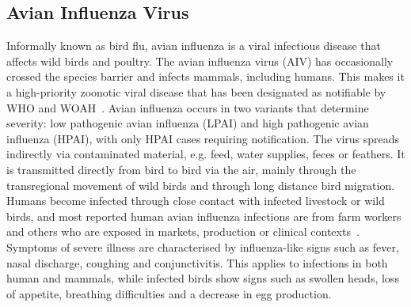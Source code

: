 \subsection{Avian Influenza Virus}
Informally known as bird flu, avian influenza is a viral infectious disease that affects wild birds and poultry. The avian influenza virus (AIV) has occasionally crossed the species barrier and infects mammals, including humans. This makes it a high-priority zoonotic viral disease that has been designated as notifiable by WHO and WOAH~\cite{woah2023list}. Avian influenza occurs in two variants that determine severity: low pathogenic avian influenza (LPAI) and high pathogenic avian influenza (HPAI), with only HPAI cases requiring notification. The virus spreads indirectly via contaminated material, e.g. feed, water supplies, feces or feathers. It is transmitted directly from bird to bird via the air, mainly through the transregional movement of wild birds and through long distance bird migration. Humans become infected through close contact with infected livestock or wild birds, and most reported human avian influenza infections are from farm workers and others who are exposed in markets, production or clinical contexts~\cite{webster1992evolution}. \\
Symptoms of severe illness are characterised by influenza-like signs such as fever, nasal discharge, coughing and conjunctivitis. This applies to infections in both human and mammals, while infected birds show signs such as swollen heads, loss of appetite, breathing difficulties and a decrease in egg production.

